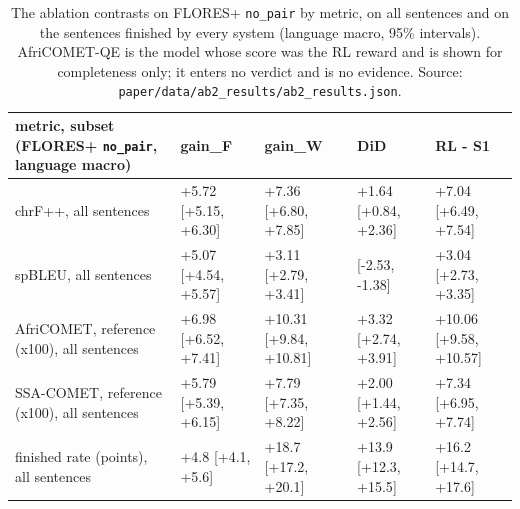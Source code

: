 \begin{table}[t]
\centering
\footnotesize
\setlength{\tabcolsep}{3pt}
\caption{The ablation contrasts on FLORES+ \texttt{no\_pair} by metric, on all sentences and on the sentences finished by every system (language macro, 95\% intervals). AfriCOMET-QE is the model whose score was the RL reward and is shown for completeness only; it enters no verdict and is no evidence. Source: \texttt{paper/data/ab2\_results/ab2\_results.json}.}
\label{tab:t_ablation_metrics}
{\def\LTcaptype{none} %
\begin{tabular}{@{}
  >{\raggedright\arraybackslash}p{}
  >{\raggedleft\arraybackslash}p{}
  >{\raggedleft\arraybackslash}p{}
  >{\raggedleft\arraybackslash}p{}
  >{\raggedleft\arraybackslash}p{}@{}}
\toprule
\begin{minipage}[b]{\linewidth}\raggedright
metric, subset (FLORES+ \texttt{no\_pair}, language macro)
\end{minipage} & \begin{minipage}[b]{\linewidth}\raggedleft
gain\_F
\end{minipage} & \begin{minipage}[b]{\linewidth}\raggedleft
gain\_W
\end{minipage} & \begin{minipage}[b]{\linewidth}\raggedleft
DiD
\end{minipage} & \begin{minipage}[b]{\linewidth}\raggedleft
RL - S1
\end{minipage} \\
\midrule
chrF++, all sentences & +5.72 {[}+5.15, +6.30{]} & +7.36 {[}+6.80, +7.85{]} & +1.64 {[}+0.84, +2.36{]} & +7.04 {[}+6.49, +7.54{]} \\
spBLEU, all sentences & +5.07 {[}+4.54, +5.57{]} & +3.11 {[}+2.79, +3.41{]} & -1.96 {[}-2.53, -1.38{]} & +3.04 {[}+2.73, +3.35{]} \\
AfriCOMET, reference (x100), all sentences & +6.98 {[}+6.52, +7.41{]} & +10.31 {[}+9.84, +10.81{]} & +3.32 {[}+2.74, +3.91{]} & +10.06 {[}+9.58, +10.57{]} \\
SSA-COMET, reference (x100), all sentences & +5.79 {[}+5.39, +6.15{]} & +7.79 {[}+7.35, +8.22{]} & +2.00 {[}+1.44, +2.56{]} & +7.34 {[}+6.95, +7.74{]} \\
finished rate (points), all sentences & +4.8 {[}+4.1, +5.6{]} & +18.7 {[}+17.2, +20.1{]} & +13.9 {[}+12.3, +15.5{]} & +16.2 {[}+14.7, +17.6{]} \\

\end{tabular}}
\end{table}
